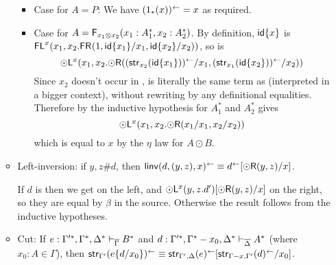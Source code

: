 \begin{enumerate}
\begin{itemize}
\begin{itemize}
\item Case for $A = P$: We have $(1_*(x))^{\leftarrow} = x$ as required.

\item Case for $A = \mathsf{F}_{x_1 \otimes x_2}(x_1:A_1^*,x_2:A_2^*)$.  By definition,
${\mathsf{id}\{x\}}$ is 
$\mathsf{FL}^{x}(x_1,x_2.\mathsf{FR}_{}(1,{\mathsf{id}\{x_1\}}/x_1,{\mathsf{id}\{x_2\}}/x_2))$, 
so 
 is 
\[
\mathord{\odot}\mathsf{L}^{x}(x_1,x_2.\mathord{\odot}\mathsf{R}((\mathsf{str}_{x_2}({\mathsf{id}\{x_1\}}))^{\leftarrow}/x_1,(\mathsf{str}_{x_1}({\mathsf{id}\{x_2\}}))^{\leftarrow}/x_2))
\]
Since $x_2$ doesn't occur in , 
is literally the same term as {} (interpreted in a
bigger context), without rewriting by any definitional equalities.  
Therefore by the inductive hypothesis for $A_1^*$ and $A_2^*$ gives
\[
\mathord{\odot}\mathsf{L}^{x}(x_1,x_2.\mathord{\odot}\mathsf{R}({x_1}/x_1,{x_2}/x_2))
\]
which is equal to $x$ by the $\eta$ law for $A \odot B$.

\end{itemize}

\item Left-inversion: if $y,z \# d$, then 
$\mathsf{linv}(d,(y,z),x)^{\leftarrow} \equiv d^{\leftarrow}[\mathord{\odot}\mathsf{R}(y,z)/x]$.

If $d$ is  then we get  on the left, and 
$\mathord{\odot}\mathsf{L}^{x}(y,z.d')[\mathord{\odot}\mathsf{R}(y,z)/x]$ on the right, so they are
equal by $\beta$ in the source.  Otherwise the result follows from the
inductive hypotheses.  


\item Cut: If 
$e : \Gamma'^*,\Gamma^*,\Delta^* \vdash_{\overline{\Gamma}} B^*$
and 
$d : \Gamma'^*,\Gamma^*-x_0,\Delta^* \vdash_{\overline{\Delta}} A^*$ (where
$x_0 : A \in \Gamma$), then
$\mathsf{str}_{\Gamma'}(e\{d/x_0\})^{\leftarrow} \equiv \mathsf{str}_{\Gamma',\Delta}(e)^{\leftarrow}[\mathsf{str}_{\Gamma-x,\Gamma'}(d)^{\leftarrow}/x_0]$.



\end{itemize}
\end{enumerate}
